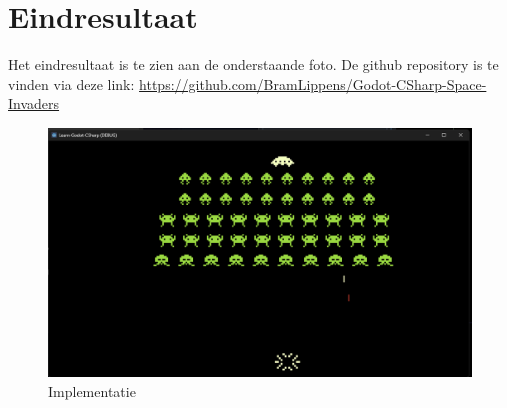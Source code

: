 \section{Eindresultaat}
Het eindresultaat is te zien aan de onderstaande foto. De github repository is te vinden via deze link: \url{https://github.com/BramLippens/Godot-CSharp-Space-Invaders}
\begin{figure}[h]
    \centering
    \includegraphics[width=1\textwidth]{ImplementatieSpel.png}
    \caption{Implementatie}
    \label{fig:POC}
\end{figure}


